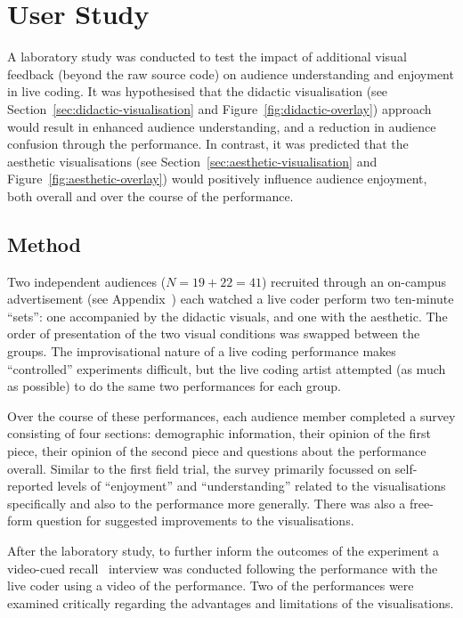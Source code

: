
\chapter{User Study}
\label{chap:user-study}

A laboratory study was conducted to test the impact of additional visual feedback (beyond the raw source code) on audience understanding and enjoyment in live coding. It was hypothesised that the didactic visualisation (see Section~\ref{sec:didactic-visualisation} and Figure~\ref{fig:didactic-overlay}) approach would result in enhanced audience understanding, and a reduction in audience confusion through the performance. In contrast, it was predicted that the aesthetic visualisations (see Section~\ref{sec:aesthetic-visualisation} and Figure~\ref{fig:aesthetic-overlay}) would positively influence audience enjoyment, both overall and over the course of the performance. 



\section{Method}

Two independent audiences ($N=19+22=41$) recruited through an on-campus advertisement (see Appendix~) each watched a live coder perform two ten-minute ``sets'': one accompanied by the didactic visuals, and one with the aesthetic. The order of presentation of the two visual conditions was swapped between the groups. The improvisational nature of a live coding performance makes ``controlled'' experiments difficult, but the live coding artist attempted (as much as possible) to do the same two performances for each group.

Over the course of these performances, each audience member completed a survey consisting of four sections: demographic information, their opinion of the first piece, their opinion of the second piece and questions about the performance overall. Similar to the first field trial, the survey primarily focussed on self-reported levels of ``enjoyment'' and ``understanding'' related to the visualisations specifically and also to the performance more generally. There was also a free-form question for suggested improvements to the visualisations.

After the laboratory study, to further inform the outcomes of the experiment a video-cued recall~\cite{Suchman1992} interview was conducted following the performance with the live coder using a video of the performance. Two of the performances were examined critically regarding the advantages and limitations of the visualisations.

